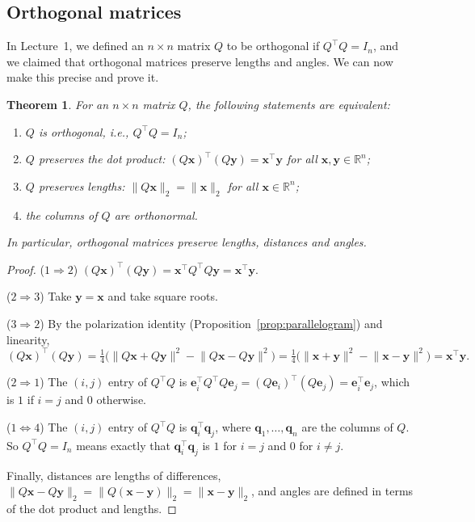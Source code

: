 \documentclass[11pt]{article}
\newcommand{\norm}[1]{\lVert #1 \rVert}
\theoremstyle{definition}
\theoremstyle{plain}
\newtheorem{theorem}[definition]{Theorem}
\theoremstyle{remark}
\begin{document}
\subsection{Orthogonal matrices}

In Lecture~1, we defined an $n \times n$ matrix $Q$ to be orthogonal if $Q^\top Q = I_n$, and we claimed that orthogonal matrices preserve lengths and angles. We can now make this precise and prove it.

\begin{theorem}\label{thm:orthogonal}
    For an $n \times n$ matrix $Q$, the following statements are equivalent:
    \begin{enumerate}
        \item $Q$ is orthogonal, i.e., $Q^\top Q = I_n$;
        \item $Q$ preserves the dot product: $(Q\mathbf{x})^\top (Q\mathbf{y}) = \mathbf{x}^\top \mathbf{y}$ for all $\mathbf{x}, \mathbf{y} \in \mathbb{R}^n$;
        \item $Q$ preserves lengths: $\norm{Q\mathbf{x}}_2 = \norm{\mathbf{x}}_2$ for all $\mathbf{x} \in \mathbb{R}^n$;
        \item the columns of $Q$ are orthonormal.
    \end{enumerate}
    In particular, orthogonal matrices preserve lengths, distances and angles.
\end{theorem}

\begin{proof}
    ($1 \Rightarrow 2$) $(Q\mathbf{x})^\top (Q\mathbf{y}) = \mathbf{x}^\top Q^\top Q \mathbf{y} = \mathbf{x}^\top \mathbf{y}$.

    ($2 \Rightarrow 3$) Take $\mathbf{y} = \mathbf{x}$ and take square roots.

    ($3 \Rightarrow 2$) By the polarization identity (Proposition~\ref{prop:parallelogram}) and linearity,
    \[(Q\mathbf{x})^\top (Q\mathbf{y}) = \tfrac{1}{4}\big(\norm{Q\mathbf{x} + Q\mathbf{y}}^2 - \norm{Q\mathbf{x} - Q\mathbf{y}}^2\big) = \tfrac{1}{4}\big(\norm{\mathbf{x} + \mathbf{y}}^2 - \norm{\mathbf{x} - \mathbf{y}}^2\big) = \mathbf{x}^\top \mathbf{y}.\]

    ($2 \Rightarrow 1$) The $(i, j)$ entry of $Q^\top Q$ is $\mathbf{e}_i^\top Q^\top Q \mathbf{e}_j = (Q\mathbf{e}_i)^\top (Q\mathbf{e}_j) = \mathbf{e}_i^\top \mathbf{e}_j$, which is $1$ if $i = j$ and $0$ otherwise.

    ($1 \Leftrightarrow 4$) The $(i, j)$ entry of $Q^\top Q$ is $\mathbf{q}_i^\top \mathbf{q}_j$, where $\mathbf{q}_1, \ldots, \mathbf{q}_n$ are the columns of $Q$. So $Q^\top Q = I_n$ means exactly that $\mathbf{q}_i^\top \mathbf{q}_j$ is $1$ for $i = j$ and $0$ for $i \neq j$.

    Finally, distances are lengths of differences, $\norm{Q\mathbf{x} - Q\mathbf{y}}_2 = \norm{Q(\mathbf{x} - \mathbf{y})}_2 = \norm{\mathbf{x} - \mathbf{y}}_2$, and angles are defined in terms of the dot product and lengths.
\end{proof}
\end{document}
